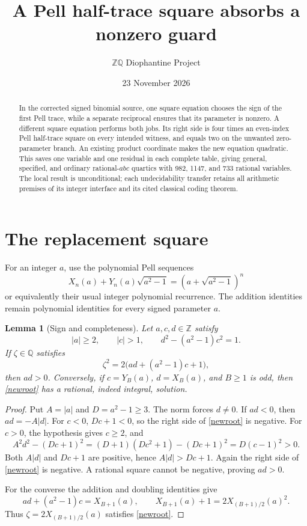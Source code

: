 \documentclass[11pt]{article}
\title{A Pell half-trace square absorbs a nonzero guard}
\author{\(\mathbb Z\mathbb Q\) Diophantine Project}
\date{23 November 2026}
\newtheorem{lemma}[theorem]{Lemma}
\newcommand{\Z}{\mathbb Z}\newcommand{\Q}{\mathbb Q}
\begin{document}
\maketitle

\begin{abstract}
In the corrected signed binomial source, one square equation chooses
the sign of the first Pell trace, while a separate reciprocal ensures
that its parameter is nonzero. A different square equation performs
both jobs. Its right side is four times an even-index Pell half-trace
square on every intended witness, and equals two on the unwanted
zero-parameter branch. An existing product coordinate makes the new
equation quadratic. This saves one variable and one residual in each
complete table, giving general, specified, and ordinary rational-\(abc\)
quartics with 982, 1147, and 733 rational variables. The local result
is unconditional; each undecidability transfer retains all arithmetic
premises of its integer interface and its cited classical coding theorem.
\end{abstract}

\section{The replacement square}

For an integer \(a\), use the polynomial Pell sequences
\[
 X_n(a)+Y_n(a)\sqrt{a^2-1}
       =(a+\sqrt{a^2-1})^n
\]
or equivalently their usual integer polynomial recurrence. The
addition identities remain polynomial identities for every signed
parameter \(a\).

\begin{lemma}[Sign and completeness]\label{branch}
Let \(a,c,d\in\Z\) satisfy
\[
 |a|\ge2,\qquad |c|>1,\qquad d^2-(a^2-1)c^2=1.
\]
If \(\zeta\in\Q\) satisfies
\begin{equation}\label{newroot}
                 \zeta^2=2\bigl(ad+(a^2-1)c+1\bigr),
\end{equation}
then \(ad>0\). Conversely, if
\(c=Y_B(a)\), \(d=X_B(a)\), and \(B\ge1\) is odd, then
\eqref{newroot} has a rational, indeed integral, solution.
\end{lemma}
\begin{proof}
Put \(A=|a|\) and \(D=a^2-1\ge3\). The norm forces
\(d\ne0\). If \(ad<0\), then \(ad=-A|d|\). For \(c<0\),
\(Dc+1<0\), so the right side of \eqref{newroot} is negative.
For \(c>0\), the hypothesis gives \(c\ge2\), and
\[
 A^2d^2-(Dc+1)^2
   =(D+1)(Dc^2+1)-(Dc+1)^2
   =D(c-1)^2>0.
\]
Both \(A|d|\) and \(Dc+1\) are positive, hence
\(A|d|>Dc+1\). Again the right side of \eqref{newroot}
is negative. A rational square cannot be negative, proving \(ad>0\).

For the converse the addition and doubling identities give
\[
 ad+(a^2-1)c=X_{B+1}(a),\qquad
 X_{B+1}(a)+1=2X_{(B+1)/2}(a)^2.
\]
Thus \(\zeta=2X_{(B+1)/2}(a)\) satisfies \eqref{newroot}.
\end{proof}
\end{document}
